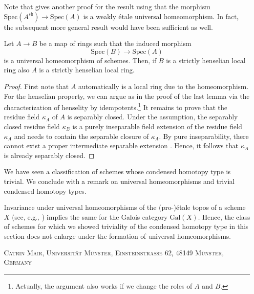 \documentclass[leqno]{article}
\renewcommand{\Gal}{\mathrm{Gal}}
\renewcommand{\Spec}{\mathrm{Spec}}
\begin{document}
Note that \cite[\href{https://stacks.math.columbia.edu/tag/0F6V}{Lemma 0F6V}]{stacksproject} gives another proof for the result using that the morphism $\Spec(A^{\mathrm{sh}})\rightarrow \Spec(A)$ is a weakly \'etale universal homeomorphism.
In fact, the subsequent more general result would have been sufficient as well.
\begin{lemma}
Let $A \rightarrow B$ be a map of rings such that the induced morphism $$\Spec(B)\rightarrow \Spec(A)$$ is a universal homeomorphism of schemes.
Then, if $B$ is a strictly henselian local ring also $A$ is a strictly henselian local ring.
\end{lemma}
\begin{proof}
First note that $A$ automatically is a local ring due to the homeomorphism.
For the henselian property, we can argue as in the proof of the last lemma via the characterization of henselity by idempotents.\footnote{Actually, the argument also works if we change the roles of $A$ and $B$.}
It remains to prove that the residue field $\kappa_A$ of $A$ is separably closed. Under the assumption, the separably closed residue field $\kappa_B$ is a purely inseparable field extension of the residue field $\kappa_A$ \cite[Proposition 4.35]{AG1} and needs to contain the separable closure of $\kappa_A$.
By pure inseparability, there cannot exist a proper intermediate separable extension \cite[\href{https://stacks.math.columbia.edu/tag/030K}{Lemma 030K}]{stacksproject}.
Hence, it follows that $\kappa_A$ is already separably closed.
\end{proof}
%
We have seen a classification of schemes whose condensed homotopy type is trivial.
We conclude with a remark on universal homeomorphisms and trivial condensed homotopy types.
\begin{remark}
Invariance under universal homeomorphisms of the (pro-)\'etale topos of a scheme $X$ (see, e.g., \cite[Lemma 5.4.2]{BhattScholzeProetale}) implies the same for the Galois category $\Gal(X)$.
Hence, the class of schemes for which we showed triviality of the condensed homotopy type in this section does not enlarge under the formation of universal homeomorphisms.
\end{remark}


\printbibliography[heading=references]


\bigskip


\noindent \textsc{Catrin Mair, Universität Münster, Einsteinstrasse 62, 48149 Münster, Germany}
\medskip
\end{document}
